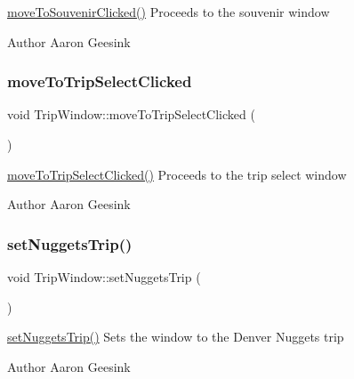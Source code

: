 \mbox{\hyperlink{class_trip_window_a258950562707b2b3f37b86542a7e70cb}{move\+To\+Souvenir\+Clicked()}} Proceeds to the souvenir window 

\begin{DoxyAuthor}{Author}
Aaron Geesink 
\end{DoxyAuthor}
\mbox{\label{class_trip_window_a022620b15ec96f33d4c5fe5c4463b311}} 
\subsubsection{\texorpdfstring{moveToTripSelectClicked}{moveToTripSelectClicked}}
{\footnotesize\ttfamily void Trip\+Window\+::move\+To\+Trip\+Select\+Clicked (\begin{DoxyParamCaption}{ }\end{DoxyParamCaption})\hspace{0.3cm}{\ttfamily [signal]}}



\mbox{\hyperlink{class_trip_window_a022620b15ec96f33d4c5fe5c4463b311}{move\+To\+Trip\+Select\+Clicked()}} Proceeds to the trip select window 

\begin{DoxyAuthor}{Author}
Aaron Geesink 
\end{DoxyAuthor}
\mbox{\label{class_trip_window_a1cba8e72154a26bb2a4c8a240b559824}} 
\subsubsection{\texorpdfstring{setNuggetsTrip()}{setNuggetsTrip()}}
{\footnotesize\ttfamily void Trip\+Window\+::set\+Nuggets\+Trip (\begin{DoxyParamCaption}{ }\end{DoxyParamCaption})}



\mbox{\hyperlink{class_trip_window_a1cba8e72154a26bb2a4c8a240b559824}{set\+Nuggets\+Trip()}} Sets the window to the Denver Nuggets trip 

\begin{DoxyAuthor}{Author}
Aaron Geesink 
\end{DoxyAuthor}
\mbox{\label{class_trip_window_a2ee37fbce38c78242d3ad8acecd42491}} 

